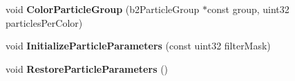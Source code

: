 \begin{DoxyCompactItemize}
\item 
\hypertarget{classTest_a57ea3d3bcffc950d4479eaab6ad99fcd}{void {\bfseries Color\-Particle\-Group} (b2\-Particle\-Group $\ast$const group, uint32 particles\-Per\-Color)}\label{classTest_a57ea3d3bcffc950d4479eaab6ad99fcd}

\item 
\hypertarget{classTest_ab8a008ae71118b79267caa4add5d705d}{void {\bfseries Initialize\-Particle\-Parameters} (const uint32 filter\-Mask)}\label{classTest_ab8a008ae71118b79267caa4add5d705d}

\item 
\hypertarget{classTest_a2decee2179856d30e9bbe9ef39ffee41}{void {\bfseries Restore\-Particle\-Parameters} ()}\label{classTest_a2decee2179856d30e9bbe9ef39ffee41}

\end{DoxyCompactItemize}
